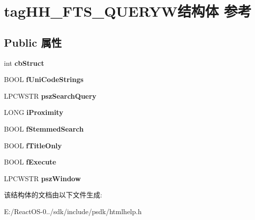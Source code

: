 \hypertarget{structtag_h_h___f_t_s___q_u_e_r_y_w}{}\section{tag\+H\+H\+\_\+\+F\+T\+S\+\_\+\+Q\+U\+E\+R\+Y\+W结构体 参考}
\label{structtag_h_h___f_t_s___q_u_e_r_y_w}
\subsection*{Public 属性}
\begin{DoxyCompactItemize}
\item 
\mbox{\label{structtag_h_h___f_t_s___q_u_e_r_y_w_a48db7d192bbf9b6c8369a50b9574675d}} 
int {\bfseries cb\+Struct}
\item 
\mbox{\label{structtag_h_h___f_t_s___q_u_e_r_y_w_a65c94c0d15df9967d14baa41e182a353}} 
B\+O\+OL {\bfseries f\+Uni\+Code\+Strings}
\item 
\mbox{\label{structtag_h_h___f_t_s___q_u_e_r_y_w_ab85436e707eae703723c70fa0066cf4b}} 
L\+P\+C\+W\+S\+TR {\bfseries psz\+Search\+Query}
\item 
\mbox{\label{structtag_h_h___f_t_s___q_u_e_r_y_w_a99213eecac0232266bd0fa1e874b37fb}} 
L\+O\+NG {\bfseries i\+Proximity}
\item 
\mbox{\label{structtag_h_h___f_t_s___q_u_e_r_y_w_a4c8869c519931e0ac624970a76e935b9}} 
B\+O\+OL {\bfseries f\+Stemmed\+Search}
\item 
\mbox{\label{structtag_h_h___f_t_s___q_u_e_r_y_w_a86376b0857cfdd5584266006bce11547}} 
B\+O\+OL {\bfseries f\+Title\+Only}
\item 
\mbox{\label{structtag_h_h___f_t_s___q_u_e_r_y_w_ab56779d7f6ed3473c947343edc454874}} 
B\+O\+OL {\bfseries f\+Execute}
\item 
\mbox{\label{structtag_h_h___f_t_s___q_u_e_r_y_w_a087c70e19d1183f6695704ce2e18b874}} 
L\+P\+C\+W\+S\+TR {\bfseries psz\+Window}
\end{DoxyCompactItemize}


该结构体的文档由以下文件生成\+:\begin{DoxyCompactItemize}
\item 
E\+:/\+React\+O\+S-\/0../sdk/include/psdk/htmlhelp.\+h\end{DoxyCompactItemize}
